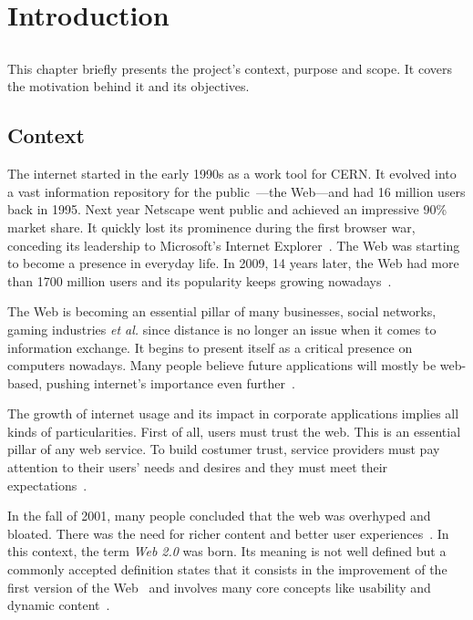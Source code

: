 \chapter{Introduction} %
\label{cha:introduction}

\section*{} %
This chapter briefly presents the project's context, purpose and scope. It covers the motivation behind it and its objectives.%


\section{Context} %
\label{sec:context}
The internet started in the early 1990s as a work tool for CERN. It evolved into a vast information repository for the public~\cite{teaching_webdev_web20}---the Web---and had 16 million users back in 1995. Next year Netscape went public and achieved an impressive 90\% market share. It quickly lost its prominence during the first browser war, conceding its leadership to Microsoft's Internet Explorer~\cite{browser_wars}. The Web was starting to become a presence in everyday life. In 2009, 14 years later, the Web had more than 1700 million users and its popularity keeps growing nowadays~\cite{internet_stats}.

The Web is becoming an essential pillar of many businesses, social networks, gaming industries \textit{et al.} since distance is no longer an issue when it comes to information exchange.  It begins to present itself as a critical presence on computers nowadays. Many people believe future applications will mostly be web-based, pushing internet's importance even further~\cite{browser_application_platform}.

The growth of internet usage and its impact in corporate applications implies all kinds of particularities. First of all, users must trust the web. This is an essential pillar of any web service. To build costumer trust, service providers must pay attention to their users' needs and desires and they must meet their expectations~\cite{trust_semantic_web}. 

In the fall of 2001, many people concluded that the web was overhyped and bloated. There was the need for richer content and better user experiences~\cite{oreilly_web20}. In this context, the term \textit{Web 2.0} was born. Its meaning is not well defined but a commonly accepted definition states that it consists in the improvement of the first version of the Web~\cite{rubyonrails_tutorial} and involves many core concepts like usability and dynamic content~\cite{what_is_web20}.

